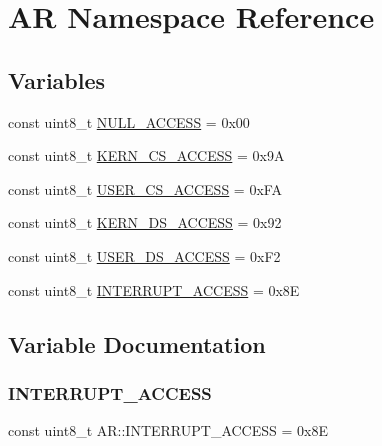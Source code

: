 \hypertarget{namespace_a_r}{}\section{AR Namespace Reference}
\label{namespace_a_r}
\subsection*{Variables}
\begin{DoxyCompactItemize}
\item 
const uint8\+\_\+t \hyperlink{namespace_a_r_a5441c70c25fc8a59482c6b49eb5263fd}{N\+U\+L\+L\+\_\+\+A\+C\+C\+E\+SS} = 0x00
\item 
const uint8\+\_\+t \hyperlink{namespace_a_r_a522bab0f6835eb217d6da7dc243cb321}{K\+E\+R\+N\+\_\+\+C\+S\+\_\+\+A\+C\+C\+E\+SS} = 0x9A
\item 
const uint8\+\_\+t \hyperlink{namespace_a_r_af35b80337e742e9605c8b3a863889545}{U\+S\+E\+R\+\_\+\+C\+S\+\_\+\+A\+C\+C\+E\+SS} = 0x\+FA
\item 
const uint8\+\_\+t \hyperlink{namespace_a_r_adc3973813b32aa819be54d431f1bdb24}{K\+E\+R\+N\+\_\+\+D\+S\+\_\+\+A\+C\+C\+E\+SS} = 0x92
\item 
const uint8\+\_\+t \hyperlink{namespace_a_r_a1b8796b06b020a1610233d041b60e101}{U\+S\+E\+R\+\_\+\+D\+S\+\_\+\+A\+C\+C\+E\+SS} = 0x\+F2
\item 
const uint8\+\_\+t \hyperlink{namespace_a_r_a22cf15841ad21a98049a02bf139f5d90}{I\+N\+T\+E\+R\+R\+U\+P\+T\+\_\+\+A\+C\+C\+E\+SS} = 0x8E
\end{DoxyCompactItemize}


\subsection{Variable Documentation}
\mbox{\label{namespace_a_r_a22cf15841ad21a98049a02bf139f5d90}} 
\subsubsection{\texorpdfstring{I\+N\+T\+E\+R\+R\+U\+P\+T\+\_\+\+A\+C\+C\+E\+SS}{INTERRUPT\_ACCESS}}
{\footnotesize\ttfamily const uint8\+\_\+t A\+R\+::\+I\+N\+T\+E\+R\+R\+U\+P\+T\+\_\+\+A\+C\+C\+E\+SS = 0x8E}



